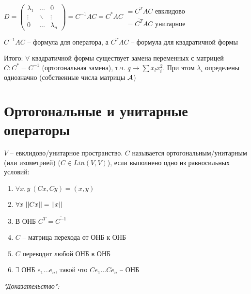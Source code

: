 \documentclass[12pt]{article}
\begin{document}
\begin{nota}{}
    $D = \begin{pmatrix}
        \lambda_1 & \ldots & 0 \\
        \vdots & \ddots & \vdots \\
        0 & \ldots & \lambda_n
    \end{pmatrix} = C^{-1}AC = C^*AC \begin{gathered}
        = C^TAC \text{ евклидово} \\
        = \overline{C^T}AC \text{ унитарное}
    \end{gathered}$

    $C^{-1}AC$ -- формула для оператора, а $C^TAC$ -- формула для квадратичной формы 

    Итого: $\forall$ квадратичной формы существует замена переменных с матрицей $C : C^* = C^{-1}$ (ортогональная замена), т.ч. $q \to \sum x_l x_i^2$. При этом $\lambda_i$ определены однозначно (собственные числа матрицы $\mathcal{A}$)
\end{nota}

\section{Ортогональные и унитарные операторы}

\begin{defin}{}
    $V$ -- евклидово/унитарное пространство. $C$ называется ортогональным/унитарным (или изометрией) ($C \in Lin(V, V)$), если выполнено одно из равносильных условий:

    \begin{enumerate}
        \item $\forall x, y\ (C x, C y) = (x, y)$
        \item $\forall x\ || Cx || = || x ||$
        \item В ОНБ $C^T = \overline{C^{-1}}$
        \item $C$ -- матрица перехода от ОНБ к ОНБ
        \item $C$ переводит любой ОНБ в ОНБ
        \item $\exists$ ОНБ $e_1 \ldots e_n$, такой что $Ce_1 \ldots Ce_n$ -- ОНБ 
    \end{enumerate}
\end{defin}

\textit{"Доказательство":}
\end{document}

